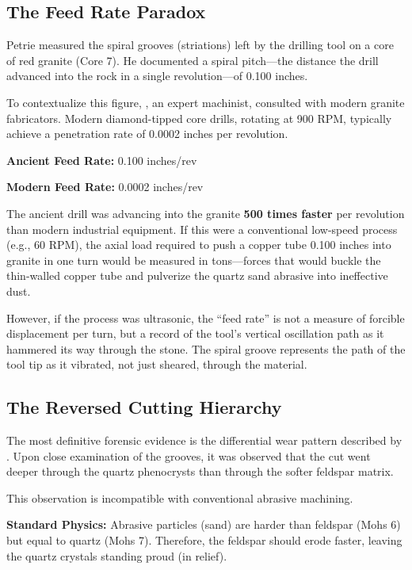 \documentclass[11pt]{article}
\begin{document}
\subsection{The Feed Rate Paradox}

Petrie measured the spiral grooves (striations) left by the drilling tool on a core of red granite (Core 7). He documented a spiral pitch---the distance the drill advanced into the rock in a single revolution---of 0.100 inches.

To contextualize this figure, \citet{Dunn1999}, an expert machinist, consulted with modern granite fabricators. Modern diamond-tipped core drills, rotating at 900 RPM, typically achieve a penetration rate of 0.0002 inches per revolution.

\textbf{Ancient Feed Rate:} 0.100 inches/rev

\textbf{Modern Feed Rate:} 0.0002 inches/rev

The ancient drill was advancing into the granite \textbf{500 times faster} per revolution than modern industrial equipment. If this were a conventional low-speed process (e.g., 60 RPM), the axial load required to push a copper tube 0.100 inches into granite in one turn would be measured in tons---forces that would buckle the thin-walled copper tube and pulverize the quartz sand abrasive into ineffective dust.

However, if the process was ultrasonic, the ``feed rate'' is not a measure of forcible displacement per turn, but a record of the tool's vertical oscillation path as it hammered its way through the stone. The spiral groove represents the path of the tool tip as it vibrated, not just sheared, through the material.

\subsection{The Reversed Cutting Hierarchy}

The most definitive forensic evidence is the differential wear pattern described by \citet{Dunn1999}. Upon close examination of the grooves, it was observed that the cut went deeper through the quartz phenocrysts than through the softer feldspar matrix.

This observation is incompatible with conventional abrasive machining.

\textbf{Standard Physics:} Abrasive particles (sand) are harder than feldspar (Mohs 6) but equal to quartz (Mohs 7). Therefore, the feldspar should erode faster, leaving the quartz crystals standing proud (in relief).
\end{document}
